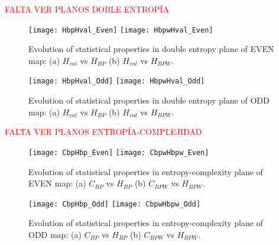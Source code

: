 \textcolor{red}{FALTA VER PLANOS DOBLE ENTROPÍA}

\begin{figure}
	\texttt{[image: HbpHval\_Even]}
	\texttt{[image: HbpwHval\_Even]}
	\caption{Evolution of statistical properties in double entropy plane of EVEN map: (a) $H_{val}$ vs $H_{BP}$ (b) $H_{val}$ vs $H_{BPW}$.}
	\label{fig:EVEN_HH}
\end{figure}

\begin{figure}
	\texttt{[image: HbpHval\_Odd]}
	\texttt{[image: HbpwHval\_Odd]}
	\caption{Evolution of statistical properties in double entropy plane of ODD map: (a) $H_{val}$ vs $H_{BP}$ (b) $H_{val}$ vs $H_{BPW}$.}
	\label{fig:ODD_HH}
\end{figure}

\textcolor{red}{FALTA VER PLANOS ENTROPÍA-COMPLEJIDAD}

\begin{figure}
	\texttt{[image: CbpHbp\_Even]}
	\texttt{[image: CbpwHbpw\_Even]}
	\caption{Evolution of statistical properties in entropy-complexity plane of EVEN map: (a) $C_{BP}$ vs $H_{BP}$ (b) $C_{BPW}$ vs $H_{BPW}$.}
	\label{fig:EVEN_HC}
\end{figure}

\begin{figure}
	\texttt{[image: CbpHbp\_Odd]}
	\texttt{[image: CbpwHbpw\_Odd]}
	\caption{Evolution of statistical properties in entropy-complexity plane of ODD map: (a) $C_{BP}$ vs $H_{BP}$ (b) $C_{BPW}$ vs $H_{BPW}$.}
	\label{fig:ODD_HC}
\end{figure}